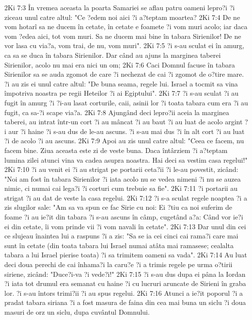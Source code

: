 2Ki 7:3  În vremea aceasta la poarta Samariei se aflau patru oameni lepro?i ?i ziceau unul catre altul: "Ce ?edem noi aici ?i a?teptam moartea?
2Ki 7:4  De ne vom hotarî sa ne ducem în cetate, în cetate e foamete ?i vom muri acolo; iar daca vom ?edea aici, tot vom muri. Sa ne ducem mai bine în tabara Sirienilor! De ne vor lasa cu via?a, vom trai, de nu, vom muri".
2Ki 7:5  ?i s-au sculat ei în amurg, ca sa se duca în tabara Sirienilor. Dar când au ajuns la marginea taberei Sirienilor, acolo nu mai era nici un om;
2Ki 7:6  Caci Domnul facuse în tabara Sirienilor sa se auda zgomot de care ?i nechezat de cai ?i zgomot de o?tire mare. ?i au zis ei unul catre altul: "De buna seama, regele lui. Israel a tocmit sa vina împotriva noastra pe regii Heteilor ?i ai Egiptului".
2Ki 7:7  ?i s-au sculat ?i au fugit în amurg ?i ?i-au lasat corturile, caii, asinii lor ?i toata tabara cum era ?i au fugit, ca sa-?i scape via?a.
2Ki 7:8  Ajungând deci lepro?ii aceia la marginea taberei, au intrat într-un cort ?i au mâncat ?i au baut ?i au luat de acolo argint ?i aur ?i haine ?i s-au dus de le-au ascuns. ?i s-au mai dus ?i în alt cort ?i au luat ?i de acolo ?i au ascuns.
2Ki 7:9  Apoi au zis unul catre altul: "Ceea ce facem, nu facem bine. Ziua aceasta este zi de veste buna. Daca întârziem ?i a?teptam lumina zilei atunci vina va cadea asupra noastra. Hai deci sa vestim casa regelui!"
2Ki 7:10  ?i au venit ei ?i au strigat pe portarii ceta?ii ?i le-au povestit, zicând: "Noi am fost în tabara Sirienilor ?i iata acolo nu se vedea nimeni ?i nu se auzea nimic, ci numai cai lega?i ?i corturi cum trebuie sa fie".
2Ki 7:11  ?i portarii au strigat ?i au dat de veste la casa regelui.
2Ki 7:12  ?i s-a sculat regele noaptea ?i a zis slugilor sale: "Am sa va spun ce fac Sirie cu noi: Ei ?tiu ca noi suferim de foame ?i au ie?it din tabara ?i s-au ascuns în câmp, cugetând a?a: Când vor ie?i ei din cetate, îi vom prinde vii ?i vom navali în cetate".
2Ki 7:13  Dar unul din cei ce slujeau înaintea lui a raspuns ?i a zis: "Sa se ia cei cinci cai rama?i care mai sunt în cetate (din toata tabara lui Israel numai atâta mai ramasese; cealalta tabara a lui Israel pierise toata) ?i sa trimitem oameni sa vada".
2Ki 7:14  Au luat deci doua perechi de cai înhama?i la caru?e ?i a trimis regele pe urma o?tirii siriene, zicând: "Duce?i-va ?i vede?i!"
2Ki 7:15  ?i s-au dus dupa ei pâna la Iordan ?i iata tot drumul era semanat cu haine ?i cu lucruri aruncate de Sirieni în graba lor. ?i s-au întors trimi?ii ?i au spus regelui.
2Ki 7:16  Atunci a ie?it poporul ?i a pradat tabara siriana ?i a fost masura de faina din cea mai buna un siclu ?i doua masuri de orz un siclu, dupa cuvântul Domnului.
